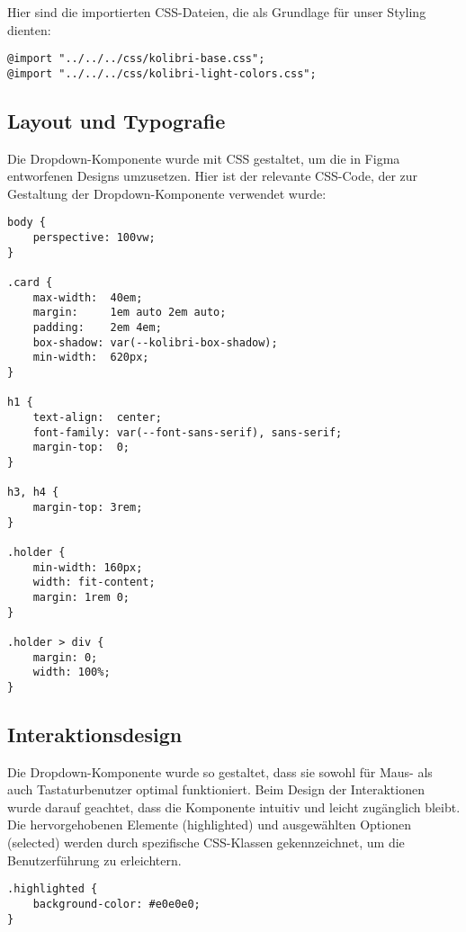 Hier sind die importierten CSS-Dateien, die als Grundlage für unser Styling dienten:

\begin{lstlisting}[style = htmlcssjs, caption = CSS Imports, label = code:cssImports]
@import "../../../css/kolibri-base.css";
@import "../../../css/kolibri-light-colors.css";
\end{lstlisting}


\subsection{Layout und Typografie}

Die Dropdown-Komponente wurde mit CSS gestaltet, um die in Figma entworfenen Designs umzusetzen. 
Hier ist der relevante CSS-Code, der zur Gestaltung der Dropdown-Komponente verwendet wurde:

\begin{lstlisting}[style = htmlcssjs, caption = style.css der Demo-Page, label = code:styleDemoPage]
body {
    perspective: 100vw;
}

.card {
    max-width:  40em;
    margin:     1em auto 2em auto;
    padding:    2em 4em;
    box-shadow: var(--kolibri-box-shadow);
    min-width:  620px;
}

h1 {
    text-align:  center;
    font-family: var(--font-sans-serif), sans-serif;
    margin-top:  0;
}

h3, h4 {
    margin-top: 3rem;
}

.holder {
    min-width: 160px;
    width: fit-content;
    margin: 1rem 0;
}

.holder > div {
    margin: 0;
    width: 100%;
}
\end{lstlisting}


\subsection{Interaktionsdesign}

Die Dropdown-Komponente wurde so gestaltet, dass sie sowohl für Maus- als auch Tastaturbenutzer optimal funktioniert. 
Beim Design der Interaktionen wurde darauf geachtet, dass die Komponente intuitiv und leicht zugänglich bleibt. 
Die hervorgehobenen Elemente (highlighted) und ausgewählten Optionen (selected) werden durch spezifische CSS-Klassen gekennzeichnet, um die Benutzerführung zu erleichtern.

\begin{lstlisting}[style = htmlcssjs, caption = Style Beispiel für Zustand Highlight, label = code:styleExample]
.highlighted {
    background-color: #e0e0e0;
}
\end{lstlisting}


